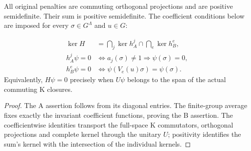 \begin{theorem}
    \label{thm:peps_qd_original_kernel}
    \leanok
    All original penalties are commuting orthogonal projections and
    are positive semidefinite. Their sum is positive semidefinite. The
    coefficient conditions below are imposed for every $\sigma\in G^\Lambda$
    and $u\in G$:

    \begin{align}
        \ker H
          &=\bigcap_j\ker h_A^j\cap\bigcap_e\ker h_B^e,\\
        h_A^j\psi=0
          &\iff a_j(\sigma)\ne1\Longrightarrow\psi(\sigma)=0,\\
        h_B^e\psi=0
          &\iff\psi(V_e(u)\sigma)=\psi(\sigma).
    \end{align}
    Equivalently, $H\psi=0$ precisely when $U\psi$ belongs to the span
    of the actual commuting K closures.
\end{theorem}
\begin{proof}\leanok
    The A assertion follows from its diagonal entries. The finite-group
    average fixes exactly the invariant coefficient functions, proving
    the B assertion. The coefficientwise identities transport the
    full-space K commutators, orthogonal projections and complete kernel
    through the unitary $U$; positivity identifies the sum's kernel with
    the intersection of the individual kernels.
\end{proof}


